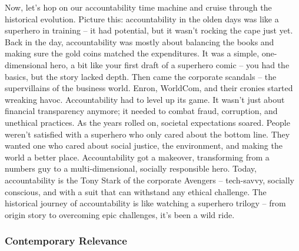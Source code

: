 \documentclass[
  letterpaper,
  DIV=11,
  numbers=noendperiod]{scrreprt}
\begin{document}
Now, let's hop on our accountability time machine and cruise through the
historical evolution. Picture this: accountability in the olden days was
like a superhero in training -- it had potential, but it wasn't rocking
the cape just yet. Back in the day, accountability was mostly about
balancing the books and making sure the gold coins matched the
expenditures. It was a simple, one-dimensional hero, a bit like your
first draft of a superhero comic -- you had the basics, but the story
lacked depth. Then came the corporate scandals -- the supervillains of
the business world. Enron, WorldCom, and their cronies started wreaking
havoc. Accountability had to level up its game. It wasn't just about
financial transparency anymore; it needed to combat fraud, corruption,
and unethical practices. As the years rolled on, societal expectations
soared. People weren't satisfied with a superhero who only cared about
the bottom line. They wanted one who cared about social justice, the
environment, and making the world a better place. Accountability got a
makeover, transforming from a numbers guy to a multi-dimensional,
socially responsible hero. Today, accountability is the Tony Stark of
the corporate Avengers -- tech-savvy, socially conscious, and with a
suit that can withstand any ethical challenge. The historical journey of
accountability is like watching a superhero trilogy -- from origin story
to overcoming epic challenges, it's been a wild ride.

\subsubsection{Contemporary Relevance}\label{contemporary-relevance}
\end{document}
